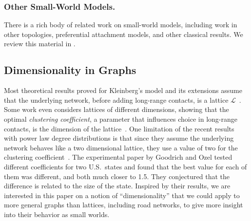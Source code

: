 \subsubsection{Other Small-World Models.}

There is a rich body of related work on small-world models, including
work in other topologies, preferential attachment models, and other classical
results.
We review this material in .

\subsection{Dimensionality in Graphs}

Most theoretical results proved for Kleinberg's model and its extensions assume
that the underlying network, before adding long-range contacts, is a lattice
$\mathcal{L}$~\cite{kleinberg2000small,martel,gila2023highway}.
Some work even considers lattices of different dimensions, showing that the
optimal \emph{clustering coefficient}, a
parameter that influences choice in long-range contacts, is
the dimension of the lattice~\cite{martel}.
One limitation of the recent results with power law degree distributions is that
since they assume the underlying network behaves like a two dimensional lattice,
they use a value of two for the clustering
coefficient~\cite{goodrich2022modeling,gila2023highway}.
The experimental paper by Goodrich and Ozel \cite{goodrich2022modeling} tested
different coefficients for two U.S.~states 
and found that the best value for each of
them was different, and both much closer to 1.5. 
They conjectured that the difference is
related to the size of the state.
Inspired by their results, we are interested in this
paper on a notion of ``dimensionality'' that
we could apply to more general graphs than lattices, 
including road networks, to give
more insight into their behavior as small worlds.

